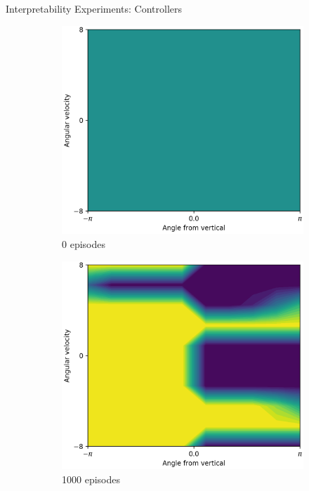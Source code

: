 \documentclass{beamer}
\begin{document}
\begin{frame}{Interpretability Experiments: Controllers}
\begin{figure}[t]
\begin{subfigure}{0.05\linewidth}
    \end{subfigure}
    \begin{subfigure}{0.30\linewidth}
      \centering
      \includegraphics[width=0.9\linewidth,trim=0 0 0 0,clip]{assets/ref_plots/controller_refcolexps_r10c2_1_ep0}
      \caption{0 episodes}
    \end{subfigure}
    \begin{subfigure}{0.30\linewidth}
      \centering
      \includegraphics[width=0.9\linewidth,trim=0 0 0 0,clip]{assets/ref_plots/controller_refcolexps_r10c2_1_ep1000}
      \caption{1000 episodes}
    \end{subfigure}
    \begin{subfigure}{0.30\linewidth}

\end{subfigure}
\end{figure}
\end{frame}
\end{document}
